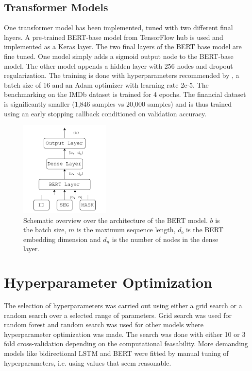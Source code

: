 \subsection{Transformer Models}

One transformer model has been implemented, tuned with two different final layers. A pre-trained BERT-base model from TensorFlow hub is used and implemented as a Keras layer. The two final layers of the BERT base model are fine tuned. One model simply adds a sigmoid output node to the BERT-base model. The other model appends a hidden layer with 256 nodes and dropout regularization. 
The training is done with hyperparameters recommended by \citeauthor{devlin2018bert}, a batch size of 16 and an Adam optimizer with learning rate 2e-5. 
The benchmarking on the IMDb dataset is trained for 4 epochs. The financial dataset is significantly smaller (1,846 samples vs 20,000 samples) and is thus trained using an early stopping callback conditioned on validation accuracy.  

\begin{figure}[t]
    \centering
    \includegraphics[width=0.4\textwidth]{Figures/figs-bert-ff.pdf}
    \caption{Schematic overview over the architecture of the BERT model. $b$ is the batch size, $m$ is the maximum sequence length, $d_b$ is the BERT embedding dimension and $d_n$ is the number of nodes in the dense layer.}
\end{figure}


\section{Hyperparameter Optimization}

The selection of hyperparameters was carried out using either a grid search or a random search over a selected range of parameters. Grid search was used for random forest and random search was used for other models where hyperparameter optimization was made. The search was done with either 10 or 3 fold cross-validation depending on the computational feasability. More demanding models like bidirectional LSTM and BERT were fitted by manual tuning of hyperparameters, i.e. using values that seem reasonable. 


